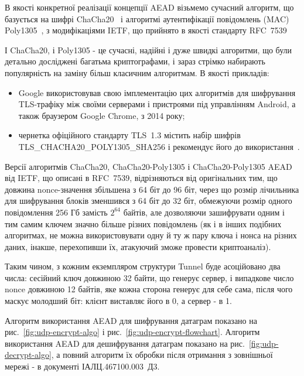 В якості конкретної реалізації концепції AEAD візьмемо сучасний алгоритм, що
базується на шифрі ChaCha20~\cite{chacha20} і алгоритмі аутентифікації
повідомлень (\gls{MAC}) Poly1305~\cite{poly1305}, з модифікаціями IETF, що
прийнято в якості стандарту RFC~7539~\cite{rfc7539}

І ChaCha20, і Poly1305 - це сучасні, надійні і дуже швидкі алгоритми, що
були детально досліджені багатьма криптографами, і зараз стрімко набирають
популярність на заміну більш класичним алгоритмам. В якості прикладів:

\begin{itemize}
\item
  Google використовував свою імплементацію цих алгоритмів для шифрування
  TLS-трафіку між своїми серверами і пристроями під управлінням Android, а
  також браузером Google Chrome, з 2014 року;
\item
  чернетка офіційного стандарту TLS~1.3 містить набір шифрів
  TLS\_CHACHA20\_POLY1305\_SHA256 і рекомендує його до використання~\cite{tls13}.
\end{itemize}

Версії алгоритмів ChaCha20, ChaCha20-Poly1305 і ChaCha20-Poly1305 \gls{AEAD}
від IETF, що описані в RFC~7539, відрізняються від оригінальних тим, що довжина
nonce-значення збільшена з 64 біт до 96 біт, через що розмір лічильника для
шифрування блоків зменшився з 64 біт до 32 біт, обмежуючи розмір одного
повідомлення 256 Гб замість $2^{64}$ байтів, але дозволяючи зашифрувати одним і
тим самим ключем значно більше різних повідомлень (як і в інших подібних
алгоритмах, не можна використовувати одну й ту ж пару ключа і нонса на різних
даних, інакше, перехопивши їх, атакуючий зможе провести криптоаналіз).

Таким чином, з кожним екземпляром структури Tunnel буде асоційовано два числа:
сесійний ключ довжиною 32 байти, що генерує сервер, і випадкове число
nonce довжиною 12 байтів, яке кожна сторона генерує для себе сама, після чого
маскує молодший біт: клієнт виставляє його в 0, а сервер - в 1.

Алгоритм використання \gls{AEAD} для шифрування датаграм показано на
рис.~\ref{fig:udp-encrypt-algo} і рис.~\ref{fig:udp-encrypt-flowchart}.
Алгоритм використання \gls{AEAD} для дешифрування датаграм показано на
рис.~\ref{fig:udp-decrypt-algo}, а повний алгоритм їх обробки після отримання
з зовнішньої мережі - в документі ІАЛЦ.467100.003~Д3.

